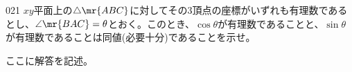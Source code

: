 \begin{prob}{021}{}{}
 $xy$平面上の$\triangle\mr{ABC}$に対してその3頂点の座標がいずれも有理数であるとし、$\angle\mr{BAC}=\theta$とおく。このとき、$\cos\theta$が有理数であることと、$\sin\theta$が有理数であることは同値(必要十分)であることを示せ。
\end{prob}
ここに解答を記述。